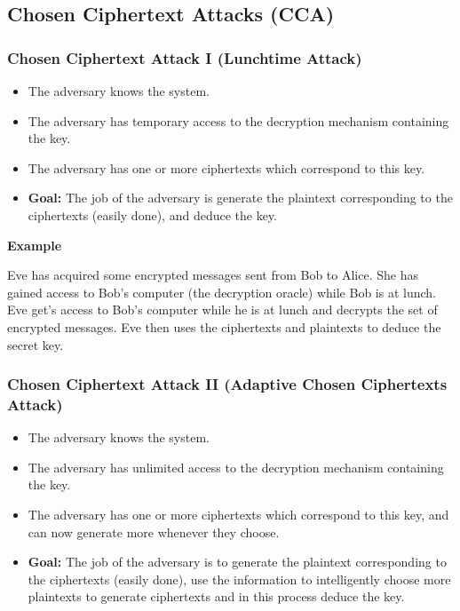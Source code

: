 \subsection{Chosen Ciphertext Attacks (CCA)}



\subsubsection*{Chosen Ciphertext Attack I (Lunchtime Attack)}

\begin{itemize}
\item The adversary knows the system.
\item The adversary has temporary access to the decryption mechanism containing the key.
\item The adversary has one or more ciphertexts which correspond to this key. 
\item \textbf{Goal:} The job of the adversary is generate the plaintext corresponding to the ciphertexts (easily done), and deduce the key.
\end{itemize}

\textbf{Example}


Eve has acquired some  encrypted messages sent from Bob to Alice.
She has gained access to Bob’s computer (the decryption oracle) while Bob is at lunch.
Eve get’s access to Bob’s computer while he is at lunch and decrypts the set of encrypted messages.
Eve then uses the ciphertexts and plaintexts to deduce the secret key.


\subsubsection*{Chosen Ciphertext Attack II (Adaptive Chosen Ciphertexts Attack)}

\begin{itemize}
\item The adversary knows the system.
\item The adversary has unlimited access to the decryption mechanism containing the key.
\item The adversary has one or more ciphertexts which correspond to this key, and can now generate more whenever they choose.
\item \textbf{Goal:} The job of the adversary is to generate the plaintext corresponding to the ciphertexts (easily done), use the information to intelligently choose more plaintexts to generate ciphertexts and in this process deduce the key.
\end{itemize}
